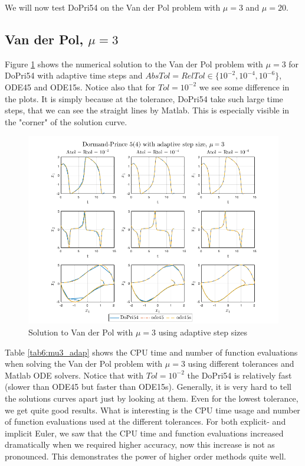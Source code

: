 We will now test DoPri54 on the Van der Pol problem with $\mu = 3$ and $\mu = 20$. 

\subsection{Van der Pol, $\mu = 3$}
Figure \ref{fig6:adap_mu3} shows the numerical solution to the Van der Pol problem with $\mu = 3$ for DoPri54 with adaptive time steps and $AbsTol=RelTol \in \{10^{-2}, 10^{-4}, 10^{-6}\}$, ODE45 and ODE15s. Notice also that for $Tol = 10^{-2}$ we see some difference in the plots. It is simply because at the tolerance, DoPri54 take such large time steps, that we can see the straight lines by Matlab. This is especially visible in the "corner" of the solution curve.

\begin{figure}[H]
    \centering
    \includegraphics[width=\textwidth]{graphics/opg6/mu3_adap.png}
    \caption{Solution to Van der Pol with $\mu = 3$ using adaptive step sizes}
    \label{fig6:adap_mu3}
\end{figure}

Table \ref{tab6:mu3_adap} shows the CPU time and number of function evaluations when solving the Van der Pol problem with $\mu = 3$ using different tolerances and Matlab ODE solvers. Notice that with $Tol = 10^{-2}$ the DoPri54 is relatively fast (slower than ODE45 but faster than ODE15s). Generally, it is very hard to tell the solutions curves apart just by looking at them. Even for the lowest tolerance, we get quite good results. What is interesting is the CPU time usage and number of function evaluations used at the different tolerances. For both explicit- and implicit Euler, we saw that the CPU time and function evaluations increased dramatically when we required higher accuracy, now this increase is not as pronounced. This demonstrates the power of higher order methods quite well.

